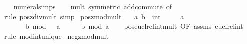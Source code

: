 \begin{isabellebody}
%
\isadelimproof
\ \ %
\endisadelimproof
%
\isatagproof
{}\isamarkupfalse%
\ numeral{\isachardot}{\kern0pt}simps\isanewline
\ \ \isamarkupfalse%
\ mult{\isacharunderscore}{\kern0pt}{}\ {\isacharbrackleft}{\kern0pt}symmetric{\isacharbrackright}{\kern0pt}\ add{\isachardot}{\kern0pt}commute\ {\isacharbrackleft}{\kern0pt}of\ {\isacharunderscore}{\kern0pt}\ {}{\isacharbrackright}{\kern0pt}\isanewline
\ \ \isamarkupfalse%
\ {\isacharparenleft}{\kern0pt}rule\ pos{\isacharunderscore}{\kern0pt}zdiv{\isacharunderscore}{\kern0pt}mult{\isacharunderscore}{\kern0pt}{}{\isacharcomma}{\kern0pt}\ simp{\isacharparenright}{\kern0pt}%
\endisatagproof
{\isafoldproof}%
%
\isadelimproof
\isanewline
%
\endisadelimproof
\isanewline
{}\isamarkupfalse%
\ pos{\isacharunderscore}{\kern0pt}zmod{\isacharunderscore}{\kern0pt}mult{\isacharunderscore}{\kern0pt}{}{\isacharcolon}{\kern0pt}\isanewline
\ \ \ a\ b\ {\isacharcolon}{\kern0pt}{\isacharcolon}{\kern0pt}\ int\isanewline
\ \ \ {\isachardoublequoteopen}{}\ {\isasymle}\ a{\isachardoublequoteclose}\isanewline
\ \ \ {\isachardoublequoteopen}{\isacharparenleft}{\kern0pt}{}\ {\isacharplus}{\kern0pt}\ {}\ {\isacharasterisk}{\kern0pt}\ b{\isacharparenright}{\kern0pt}\ mod\ {\isacharparenleft}{\kern0pt}{}\ {\isacharasterisk}{\kern0pt}\ a{\isacharparenright}{\kern0pt}\ {\isacharequal}{\kern0pt}\ {}\ {\isacharplus}{\kern0pt}\ {}\ {\isacharasterisk}{\kern0pt}\ {\isacharparenleft}{\kern0pt}b\ mod\ a{\isacharparenright}{\kern0pt}{\isachardoublequoteclose}\isanewline
%
\isadelimproof
\ \ %
\endisadelimproof
%
\isatagproof
{}\isamarkupfalse%
\ pos{\isacharunderscore}{\kern0pt}eucl{\isacharunderscore}{\kern0pt}rel{\isacharunderscore}{\kern0pt}int{\isacharunderscore}{\kern0pt}mult{\isacharunderscore}{\kern0pt}{}\ {\isacharbrackleft}{\kern0pt}OF\ assms\ eucl{\isacharunderscore}{\kern0pt}rel{\isacharunderscore}{\kern0pt}int{\isacharbrackright}{\kern0pt}\isanewline
\ \ \isamarkupfalse%
\ {\isacharparenleft}{\kern0pt}rule\ mod{\isacharunderscore}{\kern0pt}int{\isacharunderscore}{\kern0pt}unique{\isacharparenright}{\kern0pt}%
\endisatagproof
{\isafoldproof}%
%
\isadelimproof
\isanewline
%
\endisadelimproof
\isanewline
{}\isamarkupfalse%
\ neg{\isacharunderscore}{\kern0pt}zmod{\isacharunderscore}{\kern0pt}mult{\isacharunderscore}{\kern0pt}{}{\isacharcolon}{\kern0pt}\isanewline

\end{isabellebody}
